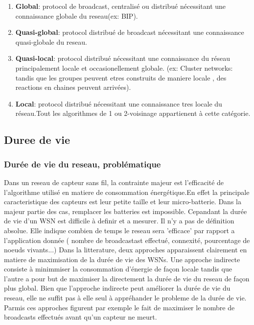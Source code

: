 \begin{enumerate}
 \item \textbf{Global}:         protocol de broadcast, centralisé ou distribué nécessitant une connaissance globale du reseau(ex: BIP).
 \item \textbf{Quasi-global}:   protocol distribué de broadcast nécessitant une connaissance quasi-globale du reseau.
 \item \textbf{Quasi-local}:    protocol distribué nécessitant une connaissance du réseau principalement locale et occasionellement globale.
(ex: Cluster networks: tandis que les groupes peuvent etres construits de maniere locale , des reactions en chaines peuvent arrivées).
 \item \textbf{Local}: 		protocol distribué nécessitant une connaissance tres locale du réseau.Tout les algorithmes de 1 ou 2-voisinage appartienent à cette catégorie.
\end{enumerate}




\subsection{Duree de vie}
\subsubsection{Durée de vie du reseau, problématique}


Dans un reseau de capteur sans fil, la contrainte majeur est l'efficacité de l'algorithme utilisé en matiere de consommation énergétique.En effet la principale caracteristique des capteurs
est leur petite taille et leur micro-batterie. Dans la majeur partie des cas, remplacer les batteries est impossible. Cepandant la durée de vie d'un WSN est difficile à definir et a mesurer.
Il n'y a pas de définition absolue. Elle indique combien de temps le reseau sera 'efficace' par rapport a l'application donnée ( nombre de broadcastast effectué, connexité, pourcentage de noeuds vivants...)
Dans la litterature, deux approches apparaissent clairement en matiere de maximisation de la durée de vie des WSNs. Une approche indirecte consiste à minimmiser la consommation d'énergie de façon locale tandis que l'autre a pour but 
de maximiser la directement la durée de vie du reseau de façon plus global. Bien que l'approche indirecte peut améliorer la durée de vie du reseau, elle ne suffit pas à elle seul à appréhander le probleme de la durée de vie.
Parmis ces approches figurent  par exemple le fait de maximiser le nombre de broadcasts effectués avant qu'un capteur ne meurt.

